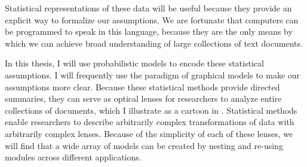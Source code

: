 Statistical representations of these data will be useful because they
provide an explicit way to formalize our assumptions.  We are
fortunate that computers can be programmed to speak in this language,
because they are the only means by which we can achieve broad
understanding of large collections of text documents.

In this thesis, I will use probabilistic models to encode these
statistical assumptions.  I will frequently use the paradigm of
graphical models \citep{pearl:1985} to make our
assumptions more clear.  Because these statistical methods provide directed
summaries, they can serve as optical lenses for researchers to analyze
entire collections of documents, which I illustrate as a cartoon in
.  Statistical methods enable researchers to
describe arbitrarily complex transformations of data with arbitrarily
complex lenses.  Because of the simplicity of each of these lenses,
we will find that a wide array of models can be created by nesting and
re-using modules across different applications.

